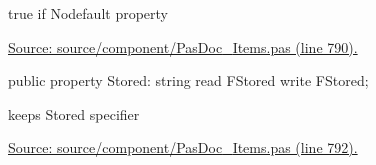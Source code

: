 \documentclass{report}
\newif\ifpdf
\begin{document}
\begin{list}{}
\par true if Nodefault property\par
\href{https://github.com/pasdoc/pasdoc/blob/master/source/component/PasDoc_Items.pas#L790}{Source: source/component/PasDoc{\_}Items.pas (line 790).}\label{PasDoc_Items.TPasProperty-Stored}
\item[\textbf{Stored}\hfill]
\ifpdf
\begin{flushleft}
\fi
\begin{ttfamily}
public property Stored: string read FStored write FStored;\end{ttfamily}

\ifpdf
\end{flushleft}
\fi


\par keeps Stored specifier\par
\href{https://github.com/pasdoc/pasdoc/blob/master/source/component/PasDoc_Items.pas#L792}{Source: source/component/PasDoc{\_}Items.pas (line 792).}\end{list}
\end{document}
